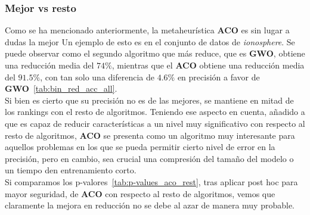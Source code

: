 \subsubsection{Mejor vs resto}
Como se ha mencionado anteriormente, la metaheurística \textbf{ACO} es sin lugar a dudas la mejor
Un ejemplo de esto es en el conjunto de datos de \textit{ionosphere}. Se puede observar como el segundo algoritmo que más reduce, que es \textbf{GWO}, obtiene una reducción media del $74\%$, mientras que el \textbf{ACO} obtiene una reducción media del $91.5\%$, con tan solo una diferencia de $4.6\%$ en precisión a favor de \textbf{GWO}~\ref{tab:bin_red_acc_all}. \\[6pt]
Si bien es cierto que su precisión no es de las mejores, se mantiene en mitad de los rankings con el resto de algoritmos. Teniendo ese aspecto en cuenta, añadido a que es capaz de reducir características a un nivel muy significativo con respecto al resto de algoritmos, \textbf{ACO} se presenta como un algoritmo muy interesante para aquellos problemas en los que se pueda permitir cierto nivel de error en la precisión, pero en cambio, sea crucial una compresión del tamaño del modelo o un tiempo den entrenamiento corto.\\[6pt]

Si comparamos los p-valores~\ref{tab:p-values_aco_rest}, tras aplicar post hoc para mayor seguridad, de \textbf{ACO} con respecto al resto de algoritmos, vemos que claramente la mejora en reducción no se debe al azar de manera muy probable.


